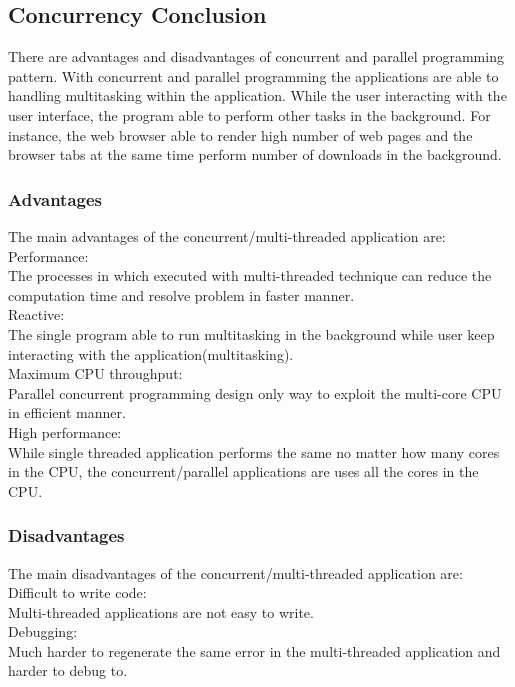 \documentclass[12pt]{article}
\begin{document}
\subsection{Concurrency Conclusion}
There are advantages and disadvantages of concurrent and parallel programming pattern. With concurrent and parallel programming the applications are able to handling multitasking within the application. While the user interacting with the user interface, the program able to perform other tasks in the background. For instance, the web browser able to render high number of web pages and the browser tabs at the same time perform number of downloads in the background.  

	\subsubsection{Advantages}
{\setlength{\parindent}{0cm}
The main advantages of the concurrent/multi-threaded application are:\\

Performance:\\
The processes in which executed with multi-threaded technique can reduce the computation time and resolve problem in faster manner.\\

Reactive:\\
The single program able to run multitasking in the background while user keep interacting with the application(multitasking).\\

Maximum CPU throughput:\\
Parallel concurrent programming design only way to exploit the multi-core CPU in efficient manner. \\

High performance:\\
While single threaded application performs the same no matter how many cores in the CPU, the concurrent/parallel applications are uses all the cores in the CPU.}
	\subsubsection{Disadvantages}
{\setlength{\parindent}{0cm}
The main disadvantages of the concurrent/multi-threaded application are:\\

Difficult to write code:\\
Multi-threaded applications are not easy to write.\\

Debugging:\\
Much harder to regenerate the same error in the multi-threaded application and harder to debug to.}
\end{document}
